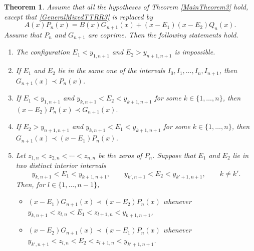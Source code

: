 \documentclass[final,3p,times,12pt]{elsarticle}
\newtheorem{theorem}{Theorem}[section]
\numberwithin{equation}{section}  %
\begin{document}
\begin{theorem}\label{MainTheorem4} Assume that all the hypotheses of Theorem \ref{MainTheorem3} hold, except that \eqref{GeneralMixedTTRR3} is replaced by \begin{equation} A(x)P_n(x) = B(x)G_{n+1}(x) + (x-E_1)(x-E_2)Q_n(x). \label{GeneralMixedTTRR4} \end{equation} Assume that $P_n$ and $G_{n+1}$ are coprime. Then the following statements hold. \begin{enumerate} \item[(a)] The configuration $ E_1<y_{1,n+1}$ and $E_2>y_{n+1,n+1} $ is impossible. \item[(b)] If $E_1$ and $E_2$ lie in the same one of the intervals $I_0,I_1,\ldots,I_n,I_{n+1}$, then $G_{n+1}(x)\prec P_n(x)$. \item[(c)] If $ E_1<y_{1,n+1} $ and $ y_{k,n+1}<E_2<y_{k+1,n+1} $ for some $k\in\{1,\ldots,n\}$, then $(x-E_2)P_n(x)\prec G_{n+1}(x).$ \item[(d)] If $E_2>y_{n+1,n+1}$ and $y_{k,n+1}<E_1<y_{k+1,n+1}$ for some $k\in\{1,\ldots,n\}$, then \newline $G_{n+1}(x)\prec (x-E_1)P_n(x)$. 
\item[(e)] Let $z_{1,n}<z_{2,n}<\cdots<z_{n,n}$ be the zeros of $P_n$.   Suppose that $E_1$ and $E_2$ lie in two distinct interior intervals \[ y_{k,n+1}<E_1<y_{k+1,n+1}, \qquad y_{k',n+1}<E_2<y_{k'+1,n+1}, \qquad k\neq k'. \] Then, for $l\in\{1,\ldots,n-1\}$, \begin{itemize}\item[(i)]    $(x-E_1)G_{n+1}(x)\prec (x-E_2)P_n(x)$  whenever $
				y_{k,n+1} < z_{l,n} < E_1 < z_{l+1,n} < y_{k+1,n+1}
				$, 
				\item[(ii)] $(x-E_2)G_{n+1}(x)\prec (x-E_1)P_n(x)$  whenever $
				y_{k',n+1} < z_{l,n} < E_2< z_{l+1,n} < y_{k'+1,n+1}$. 
			\end{itemize}\end{enumerate} \end{theorem} 
\end{document}
